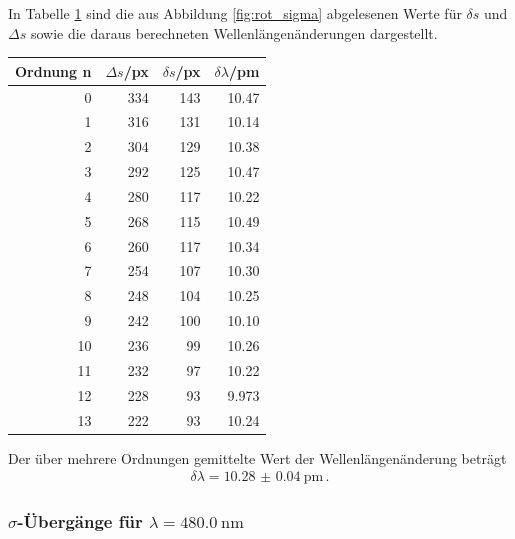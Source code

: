 \documentclass[captions=tableheading]{scrartcl}
\begin{document}
\label{fig:rot_sigma}
\vspace{0.5cm}
In Tabelle \ref{tab:rotmessung} sind die aus Abbildung \ref{fig:rot_sigma} abgelesenen Werte für $\delta s$ und $\Delta s$ sowie die daraus berechneten Wellenlängenänderungen dargestellt.
\begin{table}[H]
	\centering
	\label{tab:rotmessung}
	\begin{tabular}{r r r r}
		\toprule
		Ordnung n & $\Delta s$/px & $\delta s$/px & $\delta \lambda$/pm \\
		\midrule
		0 & 334 & 143 & 10.47 \\
		1 & 316 & 131 & 10.14 \\
		2 & 304 & 129 & 10.38 \\
		3 & 292 & 125 & 10.47 \\
		4 & 280 & 117 & 10.22 \\
		5 & 268 & 115 & 10.49 \\
		6 & 260 & 117 & 10.34 \\
		7 & 254 & 107 & 10.30 \\
		8 & 248 & 104 & 10.25 \\
		9 & 242 & 100 & 10.10 \\
		10 & 236 & 99 & 10.26 \\
		11 & 232 & 97 & 10.22 \\
		12 & 228 & 93 & 9.973 \\
		13 & 222 & 93 & 10.24 \\
		\bottomrule
	\end{tabular}
\end{table}
Der über mehrere Ordnungen gemittelte Wert der Wellenlängenänderung beträgt
\begin{align}
\delta \lambda = \SI{10.28(4)}{\pico\metre}\,.
\end{align}

\subsubsection{$\sigma$-Übergänge für $\lambda=\SI{480.0}{\nano\metre}$}
\end{document}
